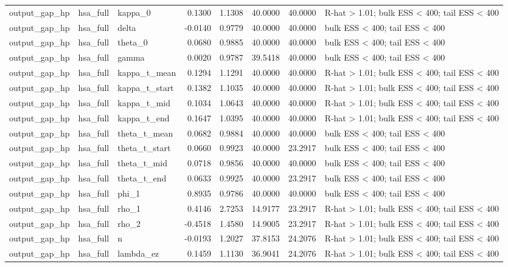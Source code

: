 \begin{tabular}{lllrrrrl}
output\_gap\_hp & hsa\_full & kappa\_0 & 0.1300 & 1.1308 & 40.0000 & 40.0000 & R-hat > 1.01; bulk ESS < 400; tail ESS < 400 \\
output\_gap\_hp & hsa\_full & delta & -0.0140 & 0.9779 & 40.0000 & 40.0000 & bulk ESS < 400; tail ESS < 400 \\
output\_gap\_hp & hsa\_full & theta\_0 & 0.0680 & 0.9885 & 40.0000 & 40.0000 & bulk ESS < 400; tail ESS < 400 \\
output\_gap\_hp & hsa\_full & gamma & 0.0020 & 0.9787 & 39.5418 & 40.0000 & bulk ESS < 400; tail ESS < 400 \\
output\_gap\_hp & hsa\_full & kappa\_t\_mean & 0.1294 & 1.1291 & 40.0000 & 40.0000 & R-hat > 1.01; bulk ESS < 400; tail ESS < 400 \\
output\_gap\_hp & hsa\_full & kappa\_t\_start & 0.1382 & 1.1035 & 40.0000 & 40.0000 & R-hat > 1.01; bulk ESS < 400; tail ESS < 400 \\
output\_gap\_hp & hsa\_full & kappa\_t\_mid & 0.1034 & 1.0643 & 40.0000 & 40.0000 & R-hat > 1.01; bulk ESS < 400; tail ESS < 400 \\
output\_gap\_hp & hsa\_full & kappa\_t\_end & 0.1647 & 1.0395 & 40.0000 & 40.0000 & R-hat > 1.01; bulk ESS < 400; tail ESS < 400 \\
output\_gap\_hp & hsa\_full & theta\_t\_mean & 0.0682 & 0.9884 & 40.0000 & 40.0000 & bulk ESS < 400; tail ESS < 400 \\
output\_gap\_hp & hsa\_full & theta\_t\_start & 0.0660 & 0.9923 & 40.0000 & 23.2917 & bulk ESS < 400; tail ESS < 400 \\
output\_gap\_hp & hsa\_full & theta\_t\_mid & 0.0718 & 0.9856 & 40.0000 & 40.0000 & bulk ESS < 400; tail ESS < 400 \\
output\_gap\_hp & hsa\_full & theta\_t\_end & 0.0633 & 0.9925 & 40.0000 & 23.2917 & bulk ESS < 400; tail ESS < 400 \\
output\_gap\_hp & hsa\_full & phi\_1 & 0.8935 & 0.9786 & 40.0000 & 40.0000 & bulk ESS < 400; tail ESS < 400 \\
output\_gap\_hp & hsa\_full & rho\_1 & 0.4146 & 2.7253 & 14.9177 & 23.2917 & R-hat > 1.01; bulk ESS < 400; tail ESS < 400 \\
output\_gap\_hp & hsa\_full & rho\_2 & -0.4518 & 1.4580 & 14.9005 & 23.2917 & R-hat > 1.01; bulk ESS < 400; tail ESS < 400 \\
output\_gap\_hp & hsa\_full & n & -0.0193 & 1.2027 & 37.8153 & 24.2076 & R-hat > 1.01; bulk ESS < 400; tail ESS < 400 \\
output\_gap\_hp & hsa\_full & lambda\_ez & 0.1459 & 1.1130 & 36.9041 & 24.2076 & R-hat > 1.01; bulk ESS < 400; tail ESS < 400 \\

\end{tabular}
